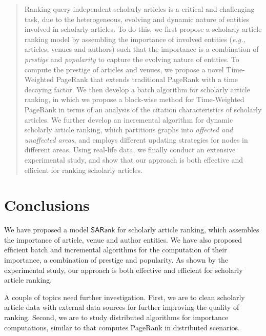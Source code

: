 \documentclass[sigconf]{acmart}
\newcounter{prop}
\newcounter{alg}[section]
\newcommand{\eg}{\emph{e.g.,}\xspace}
\newcommand{\kw}[1]{{\ensuremath {\mathsf{#1}}}\xspace}
\newcommand{\ensemblerank}{\kw{SARank}}
\begin{document}
\begin{abstract}
Ranking query independent scholarly articles is a
critical and challenging task, due to the
heterogeneous, evolving and dynamic nature of entities involved in scholarly articles.
To do this, we first propose a scholarly article ranking model by assembling the importance of involved entities (\eg articles, venues and authors) such that the importance is a combination of {\em prestige} and {\em popularity} to capture the evolving nature of entities. To compute the prestige of articles and venues, we propose a novel Time-Weighted PageRank that extends traditional PageRank with a time decaying factor. We then develop  a batch algorithm for scholarly article ranking, in which we propose a block-wise method for Time-Weighted PageRank in terms of an analysis of the citation  characteristics of scholarly articles. We further develop  an incremental algorithm for dynamic scholarly article ranking, which partitions graphs into {\em affected and unaffected areas}, and employs different updating strategies for nodes in different areas. Using real-life data, we finally conduct an extensive experimental study, and show that our approach is both effective and efficient for ranking scholarly articles.
\end{abstract}

\maketitle










\section{Conclusions}
\label{sec-conc}
We have proposed a model \ensemblerank for scholarly article ranking,
which assembles the importance of article, venue and author entities.
We have also proposed efficient batch and incremental algorithms for the computation of their importance, a combination of prestige and popularity.
As shown by the experimental study, our approach is both effective and efficient for scholarly article ranking.


A couple of topics need further investigation. First, we are to clean scholarly article data with external data sources for further improving the quality of ranking. Second, we are to study distributed algorithms for importance computations, similar to \cite{ZhuYL05} that computes PageRank in distributed scenarios.
\end{document}
